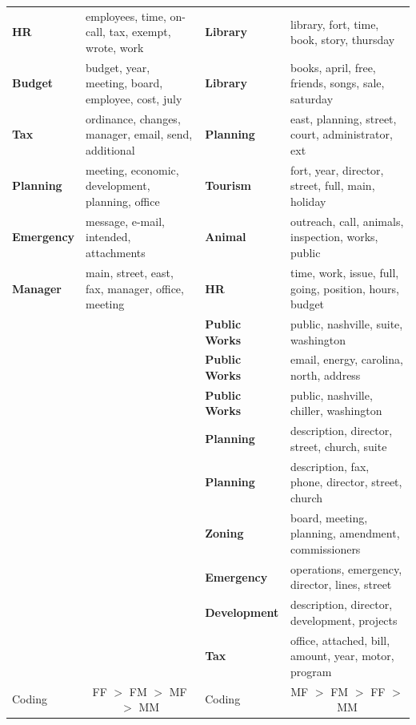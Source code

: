 \documentclass{pnastwo}
\begin{document}
\begin{article}
\begin{table}
\begin{tabular}{lm{}|lm{}}
\textbf{HR} & employees, time, on-call, tax, exempt, wrote, work
 &
\textbf{Library} & library, fort, time, book, story, thursday\\ 
\textbf{Budget} & budget, year, meeting, board, employee, cost, july
 &
\textbf{Library} & books, april, free, friends, songs, sale, saturday\\ 
\textbf{Tax} & ordinance, changes, manager, email, send, additional
 &
\textbf{Planning} & east, planning, street, court, administrator, ext\\ 
\textbf{Planning} & meeting, economic, development, planning, office
 &
\textbf{Tourism} & fort, year, director, street, full, main, holiday\\ 
\textbf{Emergency} & message, e-mail, intended, attachments
 &
\textbf{Animal} & outreach, call, animals, inspection, works, public\\ 
\textbf{Manager} & main, street, east, fax, manager, office, meeting
 &
\textbf{HR} & time, work, issue, full, going, position, hours, budget\\ 

 & &
\textbf{Public Works} & public, nashville, suite, washington\\ 

 & &
\textbf{Public Works} & email, energy, carolina, north, address\\ 

 & &
\textbf{Public Works} & public, nashville, chiller, washington\\ 

 & &
\textbf{Planning} & description, director, street, church, suite\\ 

 & &
\textbf{Planning} & description, fax, phone, director, street, church\\ 

 & &
\textbf{Zoning} & board, meeting, planning, amendment, commissioners\\ 

 & &
\textbf{Emergency} & operations, emergency, director, lines, street\\ 

 & &
\textbf{Development} & description, director, development, projects\\ 

 & &
\textbf{Tax} & office, attached, bill, amount, year, motor, program\\ 
\midrule
Coding & \multicolumn{1}{c}{FF $>$ FM $>$ MF $>$ MM} & Coding & \multicolumn{1}{c}{MF $>$ FM $>$ FF $>$ MM} \\
\midrule


\end{tabular}
\end{table}
\end{article}
\end{document}
